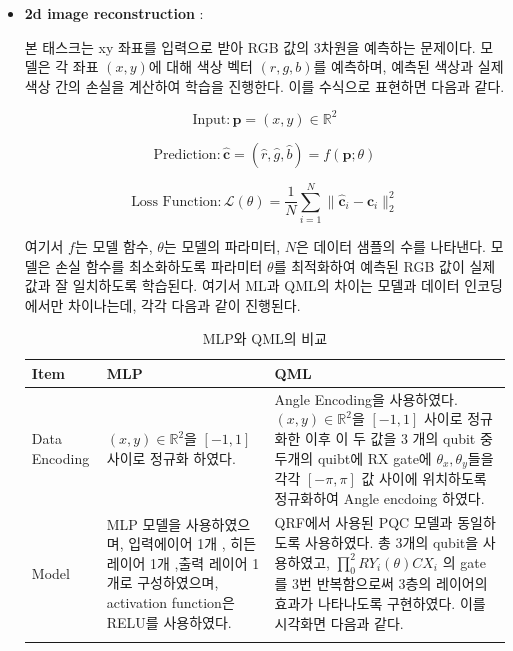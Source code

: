 \begin{itemize}
    \item \textbf{2d image reconstruction} :

        본 태스크는 xy 좌표를 입력으로 받아 RGB 값의 3차원을 예측하는 문제이다. 모델은 각 좌표 \((x, y)\)에 대해 색상 벡터 \((r, g, b)\)를 예측하며, 예측된 색상과 실제 색상 간의 손실을 계산하여 학습을 진행한다. 이를 수식으로 표현하면 다음과 같다.

            \[
            \text{Input}: \mathbf{p} = (x, y) \in \mathbb{R}^2
            \]

            \[
            \text{Prediction}: \hat{\mathbf{c}} = (\hat{r}, \hat{g}, \hat{b}) = f(\mathbf{p}; \theta)
            \]

            \[
            \text{Loss Function}: \mathcal{L}(\theta) = \frac{1}{N} \sum_{i=1}^{N} \| \hat{\mathbf{c}}_i - \mathbf{c}_i \|_2^2
            \]




            여기서 \(f\)는 모델 함수, \(\theta\)는 모델의 파라미터, \(N\)은 데이터 샘플의 수를 나타낸다. 모델은 손실 함수를 최소화하도록 파라미터 \(\theta\)를 최적화하여 예측된 RGB 값이 실제 값과 잘 일치하도록 학습된다. 여기서 ML과 QML의 차이는 모델과 데이터 인코딩에서만 차이나는데, 각각 다음과 같이 진행된다.


              \begin{table}[ht]
                    \centering
                    \begin{tabular}{ l||p{5.5cm}||p{5.5cm}}
                    \Xhline{3\arrayrulewidth}
                    \textbf{Item} & \textbf{MLP} & \textbf{QML} \\
                    \hline
                    Data Encoding & $(x,y) \in \mathbb{R}^2$을 $[-1 ,1]$ 사이로 정규화 하였다.    &
                    Angle Encoding을 사용하였다.$(x,y) \in \mathbb{R}^2$을 $[-1 ,1]$ 사이로 정규화한 이후 이 두 값을 3 개의 qubit 중 두개의 quibt에 RX gate에 $\theta_x ,\theta_y  $들을 각각 $ [-\pi ,\pi]$ 값 사이에 위치하도록 정규화하여  Angle encdoing 하였다.
                     \\
                    \hline
                    Model & MLP 모델을 사용하였으며, 입력에이어 1개 , 히든 레이어 1개 ,출력 레이어 1개로 구성하였으며, activation function은 RELU를 사용하였다. &
                    QRF에서 사용된 PQC 모델과 동일하도록 사용하였다. 총 3개의 qubit을 사용하였고, $ \prod_{0}^{2} RY_i(\theta)CX_i$ 의 gate를 3번 반복함으로써 3층의 레이어의 효과가 나타나도록 구현하였다. 이를 시각화면 다음과 같다.{fig:2d-image}
                     \\
                    \Xhline{3\arrayrulewidth}
                    \end{tabular}
                    \caption{MLP와 QML의 비교}
                    \label{tab:mlp_qml_comparison}
                \end{table}


\end{itemize}

